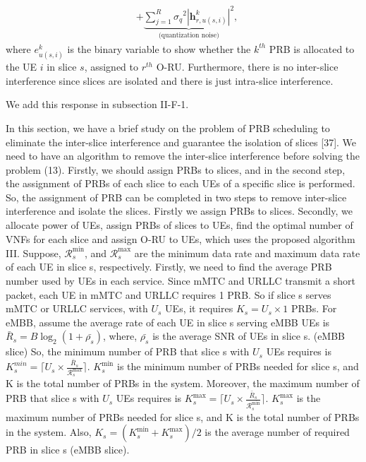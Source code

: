 \documentclass[12pt, letterpaper]{article}
\begin{document}
{\begin{subequations}
\begin{alignat}{4}
&+\underbrace{  \sum_{j=1}^{{R}} {\sigma_q}^2 |\boldsymbol{h}_{r,{u(s,i)}}^k|^2 }_{\text{(quantization noise)}},
\end{alignat}
\end{subequations}
where $e^{k}_{u(s,i)}$ is the binary variable to show whether the $k^{th}$ PRB is allocated to the UE $i$ in slice $s$, assigned to $r^{th}$ O-RU. %
Furthermore, there is no inter-slice interference since slices are isolated and there is just intra-slice interference.

We add this response in subsection II-F-1.


 In this section, we have a brief study on the problem of PRB scheduling to eliminate  the inter-slice interference and guarantee the isolation of slices [37].
We need to have an algorithm to remove the inter-slice interference before solving the problem (13). Firstly, we should assign PRBs to slices, and in the second step, the assignment of PRBs of each slice to each UEs of a specific slice is performed. So, the assignment of PRB can be completed in two steps to remove inter-slice interference and isolate the slices. Firstly we assign PRBs to slices. Secondly, we allocate power of UEs, assign PRBs of slices to UEs, find the optimal number of VNFs for each slice and assign O-RU to UEs, which uses the proposed algorithm III.
Suppose, $\mathcal{R}_{{s}}^{\min}$, and $\mathcal{R}_{{s}}^{\max}$ are the minimum data rate and maximum data rate of each UE in slice s, respectively.
Firstly, we need to find the average PRB number used by UEs in each service. Since mMTC and URLLC transmit a short packet, each UE in mMTC and URLLC requires 1 PRB. So if slice s serves mMTC or URLLC services, with $U_s$ UEs, it requires $K_s = U_s \times 1$ PRBs. For eMBB, assume the average rate of each UE in slice s serving eMBB UEs is $\bar{R}_s = B\log_2(1 + \bar{\rho_s})$, where, $\bar{\rho_s}$ is the average SNR of UEs in slice s. (eMBB slice)
So, the minimum number of PRB that slice s with $U_s$ UEs requires is $K_s^{min} = \lceil{U_s \times \frac{\bar{R}_s}{\mathcal{R}_{{s}}^{\max}}}\rceil$. $K_s^{\min} $ is the minimum number of PRBs needed for slice s, and K is the total number of PRBs in the system.  
Moreover, the maximum number of PRB that slice s with $U_s$ UEs requires is $K_s^{\max} = \lceil{U_s \times \frac{\bar{R}_s}{\mathcal{R}_{{s}}^{\min}}}\rceil$. $K_s^{\max} $ is the maximum number of PRBs needed for slice s, and K is the total number of PRBs in the system. Also, $K_s = (K_s^{\min}+K_s^{\max})/2$ is the average number of required PRB in slice s (eMBB slice).
}
\end{document}
